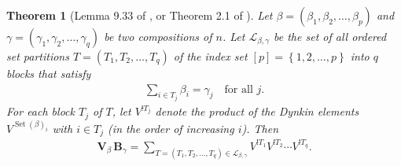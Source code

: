 \documentclass[submission]{FPSAC2026}
\newtheorem{theorem}{Theorem}
\newcommand{\Set}{\operatorname{Set}}
\newcommand{\tup}[1]{\left( #1 \right)}
\begin{document}
\begin{theorem}[Lemma 9.33 of \cite{Reutenauer1993}, or Theorem 2.1 of \cite{GarReu89}]\label{thm.vb}
Let $\beta = \tup{\beta_1,\beta_2,\ldots,\beta_p}$
and $\gamma = \tup{\gamma_1,\gamma_2,\ldots,\gamma_q}$
be two compositions of $n$.
Let $\mathcal{L}_{\beta,\gamma}$ be the set of all ordered set partitions
$T=(T_{1},T_{2},\ldots,T_{q})$ of the index set
$[p]=\left\{  1,2,\ldots ,p\right\}  $ into $q$ blocks that satisfy
\begin{align}
\sum_{i\in T_{j}}\beta_{i} = \gamma_{j} \quad\text{for all }j.
\label{eq.thm.vb.ass}
\end{align}
For each block $T_j$ of
$T$, let $V^{!T_{j}}$ denote the product
of the Dynkin elements $V^{\Set(\beta)_{i}}$ with $i\in T_{j}$
(in the order of increasing $i$). Then
\begin{align}
\mathbf{V}_{\beta}\,\mathbf{B}_{\gamma}=\sum_{T=\left(  T_{1},T_{2}%
,\ldots,T_{q}\right)
\in \mathcal{L}_{\beta,\gamma}} V^{!T_{1}} V^{!T_2} \cdots V^{!T_{q}}.
\label{eq.thm.vb.clm}
\end{align}

\end{theorem}
\end{document}
